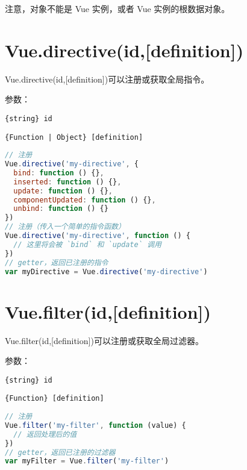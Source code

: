 注意，对象不能是 Vue 实例，或者 Vue 实例的根数据对象。


\section{Vue.directive(id,[definition])}


Vue.directive(id,[definition])可以注册或获取全局指令。

参数：

\begin{compactitem}
 \item \texttt{\{string\} id}
\item \texttt{\{Function | Object\} [definition]}
\end{compactitem}




\begin{lstlisting}[language=JavaScript]
// 注册
Vue.directive('my-directive', {
  bind: function () {},
  inserted: function () {},
  update: function () {},
  componentUpdated: function () {},
  unbind: function () {}
})
// 注册（传入一个简单的指令函数）
Vue.directive('my-directive', function () {
  // 这里将会被 `bind` 和 `update` 调用
})
// getter，返回已注册的指令
var myDirective = Vue.directive('my-directive')
\end{lstlisting}

\section{Vue.filter(id,[definition])}

Vue.filter(id,[definition])可以注册或获取全局过滤器。

参数：

\begin{compactitem}
\item \texttt{\{string\} id}
\item \texttt{\{Function\} [definition]}
\end{compactitem}



\begin{lstlisting}[language=JavaScript]
// 注册
Vue.filter('my-filter', function (value) {
  // 返回处理后的值
})
// getter，返回已注册的过滤器
var myFilter = Vue.filter('my-filter')
\end{lstlisting}



\begin{lstlisting}[language=JavaScript]

\end{lstlisting}


